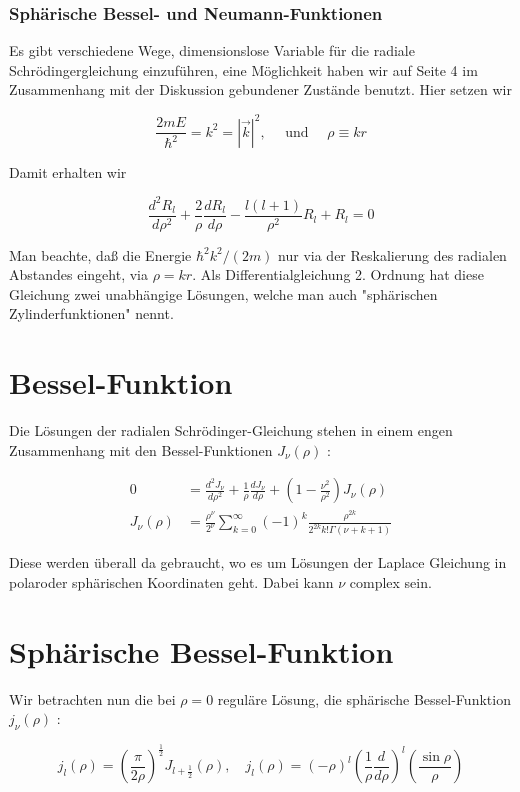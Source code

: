 \documentclass[10pt, letterpaper]{article}
\begin{document}
\subsubsection*{Sphärische Bessel- und Neumann-Funktionen}
Es gibt verschiedene Wege, dimensionslose Variable für die radiale Schrödingergleichung einzuführen, eine Möglichkeit haben wir auf Seite 4 im Zusammenhang mit der Diskussion gebundener Zustände benutzt. Hier setzen wir

$$
\frac{2 m E}{\hbar^{2}}=k^{2}=|\vec{k}|^{2}, \quad \text { und } \quad \rho \equiv k r
$$

Damit erhalten wir

$$
\frac{d^{2} R_{l}}{d \rho^{2}}+\frac{2}{\rho} \frac{d R_{l}}{d \rho}-\frac{l(l+1)}{\rho^{2}} R_{l}+R_{l}=0
$$

Man beachte, daß die Energie $\hbar^{2} k^{2} /(2 m)$ nur via der Reskalierung des radialen Abstandes eingeht, via $\rho=k r$. Als Differentialgleichung 2. Ordnung hat diese Gleichung zwei unabhängige Lösungen, welche man auch "sphärischen Zylinderfunktionen" nennt.

\section*{Bessel-Funktion}
Die Lösungen der radialen Schrödinger-Gleichung stehen in einem engen Zusammenhang mit den Bessel-Funktionen $J_{\nu}(\rho)$ :

$$
\begin{aligned}
0 & =\frac{d^{2} J_{\nu}}{d \rho^{2}}+\frac{1}{\rho} \frac{d J_{\nu}}{d \rho}+\left(1-\frac{\nu^{2}}{\rho^{2}}\right) J_{\nu}(\rho) \\
J_{\nu}(\rho) & =\frac{\rho^{\nu}}{2^{\nu}} \sum_{k=0}^{\infty}(-1)^{k} \frac{\rho^{2 k}}{2^{2 k} k!\Gamma(\nu+k+1)}
\end{aligned}
$$

Diese werden überall da gebraucht, wo es um Lösungen der Laplace Gleichung in polaroder sphärischen Koordinaten geht. Dabei kann $\nu$ complex sein.

\section*{Sphärische Bessel-Funktion}
Wir betrachten nun die bei $\rho=0$ reguläre Lösung, die sphärische Bessel-Funktion $j_{\nu}(\rho)$ :

$$
j_{l}(\rho)=\left(\frac{\pi}{2 \rho}\right)^{\frac{1}{2}} J_{l+\frac{1}{2}}(\rho), \quad j_{l}(\rho)=(-\rho)^{l}\left(\frac{1}{\rho} \frac{d}{d \rho}\right)^{l}\left(\frac{\sin \rho}{\rho}\right)
$$
\end{document}
